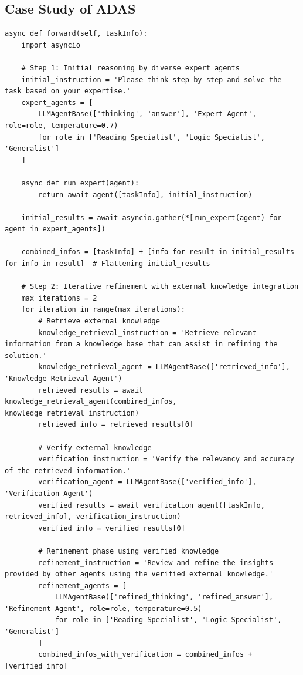 \documentclass{article} %
\theoremstyle{plain}
\theoremstyle{definition}
\theoremstyle{remark}
\begin{document}
\subsection{Case Study of ADAS}
\begin{tcolorbox}[title={\textbf{\small Iterative Knowledge-Enhanced Refinement workflow for HotpotQA}}, boxrule=1pt, arc=0mm, colback=black!5!white, colframe=black!75!white, breakable, before skip=10pt, after skip=10pt, pad at break=2mm, parbox=false] \begin{verbatim}
async def forward(self, taskInfo):
    import asyncio

    # Step 1: Initial reasoning by diverse expert agents
    initial_instruction = 'Please think step by step and solve the task based on your expertise.'
    expert_agents = [
        LLMAgentBase(['thinking', 'answer'], 'Expert Agent', role=role, temperature=0.7)
        for role in ['Reading Specialist', 'Logic Specialist', 'Generalist']
    ]

    async def run_expert(agent):
        return await agent([taskInfo], initial_instruction)

    initial_results = await asyncio.gather(*[run_expert(agent) for agent in expert_agents])

    combined_infos = [taskInfo] + [info for result in initial_results for info in result]  # Flattening initial_results

    # Step 2: Iterative refinement with external knowledge integration
    max_iterations = 2
    for iteration in range(max_iterations):
        # Retrieve external knowledge
        knowledge_retrieval_instruction = 'Retrieve relevant information from a knowledge base that can assist in refining the solution.'
        knowledge_retrieval_agent = LLMAgentBase(['retrieved_info'], 'Knowledge Retrieval Agent')
        retrieved_results = await knowledge_retrieval_agent(combined_infos, knowledge_retrieval_instruction)
        retrieved_info = retrieved_results[0]

        # Verify external knowledge
        verification_instruction = 'Verify the relevancy and accuracy of the retrieved information.'
        verification_agent = LLMAgentBase(['verified_info'], 'Verification Agent')
        verified_results = await verification_agent([taskInfo, retrieved_info], verification_instruction)
        verified_info = verified_results[0]

        # Refinement phase using verified knowledge
        refinement_instruction = 'Review and refine the insights provided by other agents using the verified external knowledge.'
        refinement_agents = [
            LLMAgentBase(['refined_thinking', 'refined_answer'], 'Refinement Agent', role=role, temperature=0.5)
            for role in ['Reading Specialist', 'Logic Specialist', 'Generalist']
        ]
        combined_infos_with_verification = combined_infos + [verified_info]
        

\end{verbatim}
\end{tcolorbox}
\end{document}
